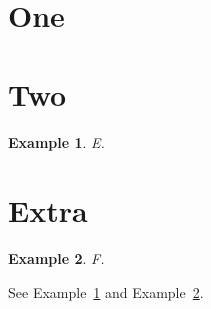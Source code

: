\documentclass{IEEEtran}
\newtheorem{example}{Example}[section]
\begin{document}
\section{One}\section{Two}
\begin{example}\label{x}E.\end{example}
\appendices
\section{Extra}
\begin{example}\label{y}F.\end{example}
See Example~\ref{x} and Example~\ref{y}.
\end{document}

